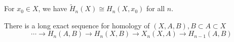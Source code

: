 \documentclass{article}
\begin{document}
\begin{corollary}
    For $x_0\in X$, we have $\widetilde{H}_n(X) \cong H_n(X,x_0)$ for all $n$.
\end{corollary}

\begin{corollary}
    There is a long exact sequence for homology of $(X,A,B), B\subset A\subset X$
    \[
    \cdots \to H_n(A,B) \to H_n(X,B) \to X_n(X,A) \to H_{n-1}(A,B)
    \]
\end{corollary}






\end{document}

